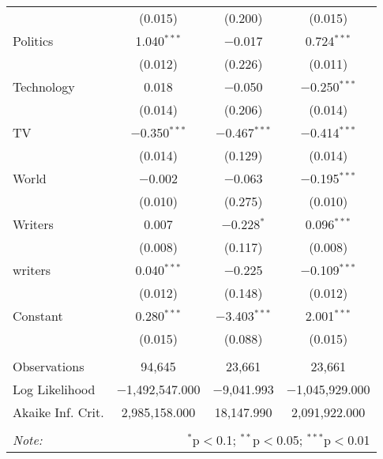\begin{table}[!htbp]
\begin{tabular}{@{\extracolsep{5pt}}lccc}
  & (0.015) & (0.200) & (0.015) \\ 
  Politics & 1.040$^{***}$ & $-$0.017 & 0.724$^{***}$ \\ 
  & (0.012) & (0.226) & (0.011) \\ 
  Technology & 0.018 & $-$0.050 & $-$0.250$^{***}$ \\ 
  & (0.014) & (0.206) & (0.014) \\ 
  TV & $-$0.350$^{***}$ & $-$0.467$^{***}$ & $-$0.414$^{***}$ \\ 
  & (0.014) & (0.129) & (0.014) \\ 
  World & $-$0.002 & $-$0.063 & $-$0.195$^{***}$ \\ 
  & (0.010) & (0.275) & (0.010) \\ 
  Writers & 0.007 & $-$0.228$^{*}$ & 0.096$^{***}$ \\ 
  & (0.008) & (0.117) & (0.008) \\ 
  writers & 0.040$^{***}$ & $-$0.225 & $-$0.109$^{***}$ \\ 
  & (0.012) & (0.148) & (0.012) \\ 
  Constant & 0.280$^{***}$ & $-$3.403$^{***}$ & 2.001$^{***}$ \\ 
  & (0.015) & (0.088) & (0.015) \\ 
 \hline \\[-1.8ex] 
Observations & 94,645 & 23,661 & 23,661 \\ 
Log Likelihood & $-$1,492,547.000 & $-$9,041.993 & $-$1,045,929.000 \\ 
Akaike Inf. Crit. & 2,985,158.000 & 18,147.990 & 2,091,922.000 \\ 
\hline 
\hline \\[-1.8ex] 
\textit{Note:}  & \multicolumn{3}{r}{$^{*}$p$<$0.1; $^{**}$p$<$0.05; $^{***}$p$<$0.01} \\ 
\end{tabular} 
\end{table} 
